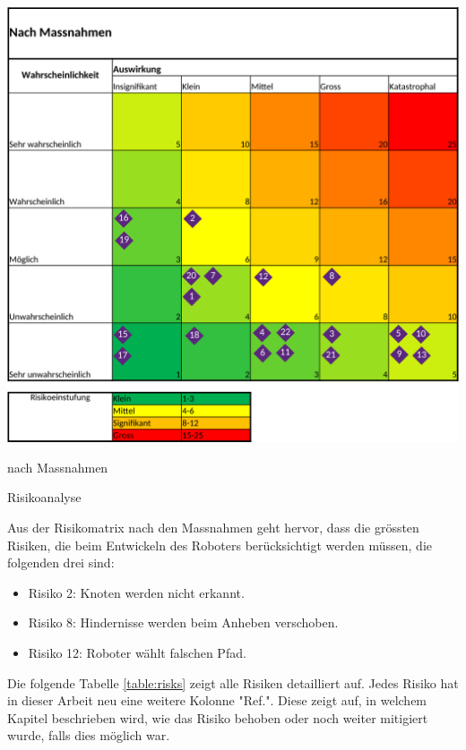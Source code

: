 \begin{table}[H]
\begin{subtable}{0.49\textwidth}
\includegraphics[width=0.99\linewidth]{assets/projektmanagement/Risikoanalyse_nachher-crop.pdf}
\caption{nach Massnahmen}
\label{table:risk-after}
\end{subtable}
\caption{Risikoanalyse}
\label{table:risk-table}
\end{table}

Aus der Risikomatrix nach den Massnahmen geht hervor, dass die grössten Risiken, die beim Entwickeln des Roboters berücksichtigt werden müssen, die folgenden drei sind:

\begin{itemize}
    \item Risiko 2: Knoten werden nicht erkannt.
    \item Risiko 8: Hindernisse werden beim Anheben verschoben.
    \item Risiko 12: Roboter wählt falschen Pfad.
\end{itemize}

Die folgende Tabelle \ref{table:risks} zeigt alle Risiken detailliert auf.  Jedes Risiko hat in dieser Arbeit neu eine weitere Kolonne "Ref.". Diese zeigt auf, in welchem Kapitel beschrieben wird, wie das Risiko behoben oder noch weiter mitigiert wurde, falls dies möglich war.

